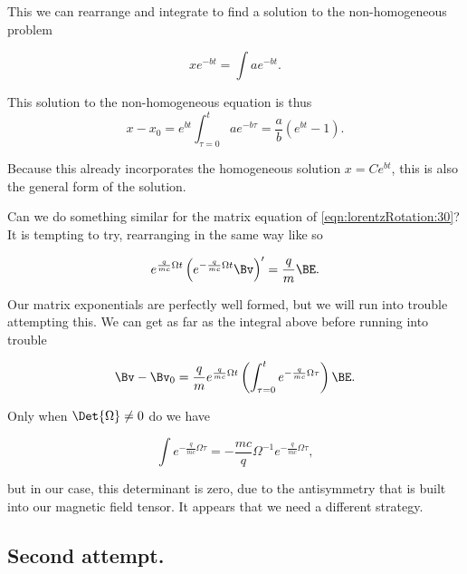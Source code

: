 This we can rearrange and integrate to find a solution to the non-homogeneous problem

\begin{equation}\label{eqn:lorentzRotation:320}
x e^{-b t} = \int a e^{-b t}.
\end{equation}

This solution to the non-homogeneous equation is thus
\begin{equation}\label{eqn:lorentzRotation:340}
x - x_0 = e^{b t} \int_{\tau = 0}^t a e^{-b \tau} = \frac{a}{b} \left(e^{bt} - 1 \right).
\end{equation}

Because this already incorporates the homogeneous solution $x = C e^{b t}$, this is also the general form of the solution.

Can we do something similar for the matrix equation of \ref{eqn:lorentzRotation:30}?  It is tempting to try, rearranging in the same way like so

\begin{equation}\label{eqn:lorentzRotation:360}
e^{ \frac{q}{m c}\Omega t} \left( e^{-\frac{q}{m c} \Omega t} \Bv \right)' = \frac{q}{m} \BE.
\end{equation}

Our matrix exponentials are perfectly well formed, but we will run into trouble attempting this.  We can get as far as the integral above before running into trouble

\begin{equation}\label{eqn:lorentzRotation:380}
\Bv - \Bv_0 = \frac{q}{m}
e^{ \frac{q }{m c} \Omega t}
\left( \int_{\tau = 0}^t
e^{ -\frac{q }{m c} \Omega \tau}
\right) \BE.
\end{equation}

Only when $\Det{\Omega} \ne 0$ do we have

\begin{equation}\label{eqn:lorentzRotation:400}
\int e^{ -\frac{q }{m c} \Omega \tau} =
- \frac{m c}{q} \Omega^{-1} e^{ -\frac{q }{m c} \Omega \tau},
\end{equation}

but in our case, this determinant is zero, due to the antisymmetry that is built into our magnetic field tensor.  It appears that we need a different strategy.

\subsection{Second attempt.}

